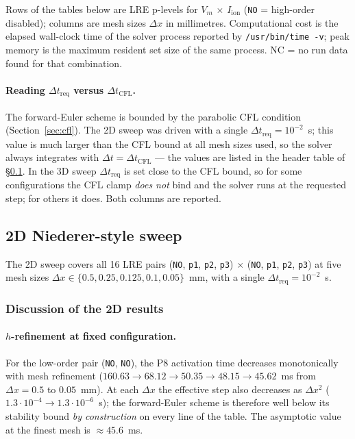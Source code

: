 \documentclass[11pt,a4paper]{article}
\newcommand{\Vm}{V_{m}}
\newcommand{\Iion}{I_{\text{ion}}}
\newcommand{\code}[1]{\texttt{\small #1}}
\begin{document}
Rows of the tables below are LRE p-levels for $\Vm$ $\times$ $\Iion$
(\texttt{NO} = high-order disabled); columns are mesh sizes
$\Delta x$ in millimetres. Computational cost is the elapsed
wall-clock time of the solver process reported by
\texttt{/usr/bin/time -v}; peak memory is the maximum resident set
size of the same process. \textsc{NC} = no run data found for that
combination.

\paragraph{Reading $\Delta t_{\text{req}}$ versus $\Delta t_{\text{CFL}}$.}
The forward-Euler scheme is bounded by the parabolic CFL condition
(Section~\ref{sec:cfl}). The 2D sweep was driven with a single
$\Delta t_{\text{req}} = 10^{-2}$~s; this value is much larger than
the CFL bound at all mesh sizes used, so the solver always integrates
with $\Delta t = \Delta t_{\text{CFL}}$ — the values are listed in
the header table of \S\ref{sec:results:2D}. In the 3D sweep
$\Delta t_{\text{req}}$ is set close to the CFL bound, so for some
configurations the CFL clamp \emph{does not} bind and the solver
runs at the requested step; for others it does. Both columns are
reported.

\subsection{2D Niederer-style sweep}
\label{sec:results:2D}

The 2D sweep covers all 16 LRE pairs
(\code{NO}, \code{p1}, \code{p2}, \code{p3}) $\times$
(\code{NO}, \code{p1}, \code{p2}, \code{p3}) at five mesh sizes
$\Delta x \in \{0.5, 0.25, 0.125, 0.1, 0.05\}$~mm, with a single
$\Delta t_{\text{req}} = 10^{-2}$~s.



\subsubsection{Discussion of the 2D results}

\paragraph{$h$-refinement at fixed configuration.}
For the low-order pair (\code{NO}, \code{NO}), the P8 activation
time decreases monotonically with mesh refinement
($160.63\rightarrow 68.12\rightarrow 50.35\rightarrow 48.15\rightarrow
45.62$~ms from $\Delta x = 0.5$ to $0.05$~mm). At each $\Delta x$ the
effective step also decreases as $\Delta x^{2}$
($1.3\!\cdot\!10^{-4}\rightarrow 1.3\!\cdot\!10^{-6}$~s); the
forward-Euler scheme is therefore well below its stability bound
\emph{by construction} on every line of the table. The asymptotic
value at the finest mesh is $\approx 45.6$~ms.
\end{document}
